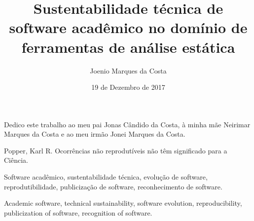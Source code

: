 \documentclass[msc, classic, a4paper]{ufbathesis}
\institute{Instituto de Matemática}
\date{19 de Dezembro de 2017}
\author{Joenio Marques da Costa}
\title{
  Sustentabilidade técnica de software acadêmico no domínio de ferramentas de
  análise estática
}
\begin{document}
\pgcompfrontpage
\frontmatter
\pgcomppresentationpage

\catalogingsheet


\begin{dedicatory}
Dedico este trabalho ao meu pai
Jonas Cândido da Costa, à minha mãe
Neirimar Marques da Costa e ao meu irmão
Jonei Marques da Costa.
\end{dedicatory}

\acknowledgements


\begin{epigraph}[1959]{Popper, Karl R.}
Ocorrências não reprodutíveis não têm significado para a Ciência.
\end{epigraph}

\resumo



\begin{keywords}
Software acadêmico, sustentabilidade técnica, evolução de software,
reprodutibilidade, publicização de software, reconhecimento de software.
\end{keywords}

\abstract



\begin{keywords}
Academic software, technical sustainability, software evolution,
reproducibility, publicization of software, recognition of software.
\end{keywords}

\tableofcontents
\listoffigures
\listoftables
\mainmatter
\end{document}
